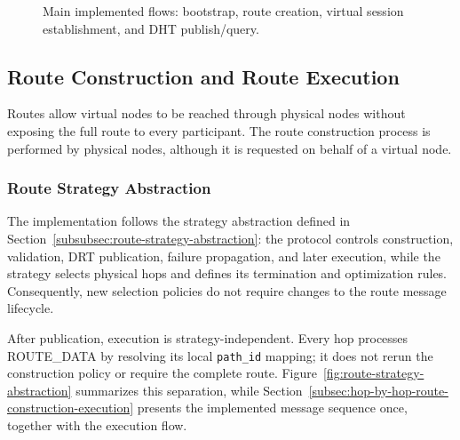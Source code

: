\documentclass[12pt,a4paper]{article}
\newcommand{\codebreak}[1]{{\footnotesize\ttfamily #1}}
\begin{document}
\begin{figure}[H]
{
}
\caption{Main implemented flows: bootstrap, route creation, virtual session establishment, and DHT publish/query.}
\label{fig:implementation-flow}
\end{figure}

\subsection{Route Construction and Route Execution}
\label{sec:route-construction-execution}

Routes allow virtual nodes to be reached through physical nodes without exposing the full route to every participant. The route construction process is performed by physical nodes, although it is requested on behalf of a virtual node.

\subsubsection{Route Strategy Abstraction}
\label{subsec:route-strategy-abstraction}

The implementation follows the strategy abstraction defined in Section~\ref{subsubsec:route-strategy-abstraction}: the protocol controls construction, validation, DRT publication, failure propagation, and later execution, while the strategy selects physical hops and defines its termination and optimization rules. Consequently, new selection policies do not require changes to the route message lifecycle.

After publication, execution is strategy-independent. Every hop processes \codebreak{ROUTE\_\allowbreak{}DATA} by resolving its local \texttt{path\_id} mapping; it does not rerun the construction policy or require the complete route. Figure~\ref{fig:route-strategy-abstraction} summarizes this separation, while Section~\ref{subsec:hop-by-hop-route-construction-execution} presents the implemented message sequence once, together with the execution flow.
\end{document}
